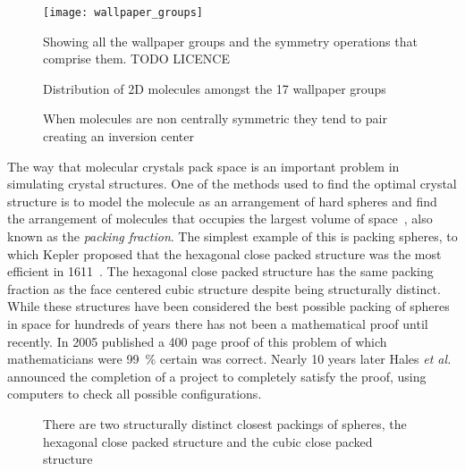 \begin{figure}
    \texttt{[image: wallpaper\_groups]}
    \caption{Showing all the wallpaper groups and the symmetry operations that comprise them. TODO LICENCE}
    \label{fig:wallpaper}
\end{figure}

\begin{figure}
    \caption{Distribution of 2D molecules amongst the 17 wallpaper groups}
    \label{fig:wallpaper dist}
\end{figure}

\begin{figure}
    \caption{When molecules are non centrally symmetric they tend to pair creating an inversion center}
    \label{fig:molecule pair}
\end{figure}

The way that molecular crystals pack space is an important problem in simulating crystal structures. One of the methods used to find the optimal crystal structure is to model the molecule as an arrangement of hard spheres and find the arrangement of molecules that occupies the largest volume of space~\cite{kitaigorodskii:73}, also known as the \emph{packing fraction}. The simplest example of this is packing spheres, to which Kepler proposed that the hexagonal close packed structure was the most efficient in 1611~\cite{kepler:1611}. The hexagonal close packed structure has the same packing fraction as the face centered cubic structure despite being structurally distinct. While these structures have been considered the best possible packing of spheres in space for hundreds of years there has not been a mathematical proof until recently. In 2005 \textcite{hales:05} published a 400 page proof of this problem of which mathematicians were \SI{99}{\percent} certain was correct. Nearly 10 years later Hales {\em et al.}~\cite{hales:14} announced the completion of a project to completely satisfy the proof, using computers to check all possible configurations. 

\begin{figure}
    \caption{There are two structurally distinct closest packings of spheres, the hexagonal close packed structure and the cubic close packed structure}
    \label{fig:sphere packing}
\end{figure}


